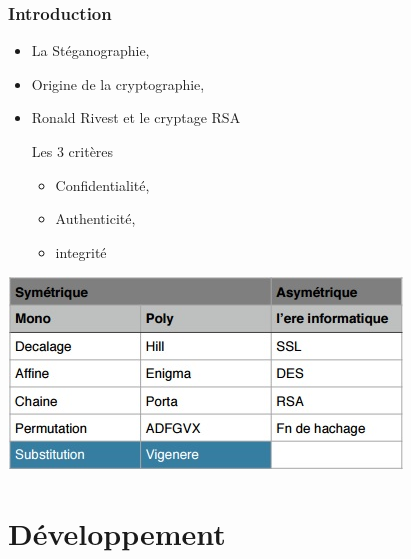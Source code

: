\documentclass[10pt,xcolor=table]{beamer}
\begin{document}
\begin{frame}
  \frametitle{Introduction}

  \begin{itemize}[<+->]
  \item La Stéganographie,
  \item Origine de la cryptographie,
  \item Ronald Rivest et le cryptage RSA
  
  \begin{block}{Les 3 critères}
    \begin{itemize}
    \item Confidentialité,
    \item Authenticité,
    \item integrité
    \end{itemize}
  \end{block}
  \end{itemize}
  \pause
  \begin{center}\includegraphics[scale=0.4]{Tab1.jpg}\end{center}

\end{frame}

\section{Développement}
\end{document}
